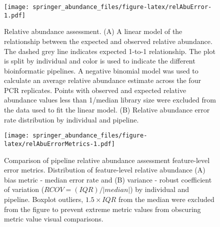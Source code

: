 \documentclass[smallextended]{svjour3}       %
\begin{document}
\begin{figure}
\centering
\texttt{[image: springer\_abundance\_files/figure-latex/relAbuError-1.pdf]}
\caption{\label{fig:relAbuError}Relative abundance assessment. (A) A linear
model of the relationship between the expected and observed relative
abundance. The dashed grey line indicates expected 1-to-1 relationship.
The plot is split by individual and color is used to indicate the
different bioinformatic pipelines. A negative binomial model was used to
calculate an average relative abundance estimate across the four PCR
replicates. Points with observed and expected relative abundance values
less than 1/median library size were excluded from the data used to fit
the linear model. (B) Relative abundance error rate distribution by
individual and pipeline.}
\end{figure}

\begin{figure}
\centering
\texttt{[image: springer\_abundance\_files/figure-latex/relAbuErrorMetrics-1.pdf]}
\caption{\label{fig:relAbuErrorMetrics}Comparison of pipeline relative
abundance assessment feature-level error metrics. Distribution of
feature-level relative abundance (A) bias metric - median error rate and
(B) variance - robust coefficient of variation (\(RCOV=(IQR)/|median|\))
by individual and pipeline. Boxplot outliers, \(1.5\times IQR\) from the
median were excluded from the figure to prevent extreme metric values
from obscuring metric value visual comparisons.}
\end{figure}

\begin{table}

\caption{\label{tab:relAbuErrorTbl}Maximum feature-level error rate bias (median error rate) and variance (robust COV) by pipeline and individual.}
\centering
{}
\end{table}
\end{document}
